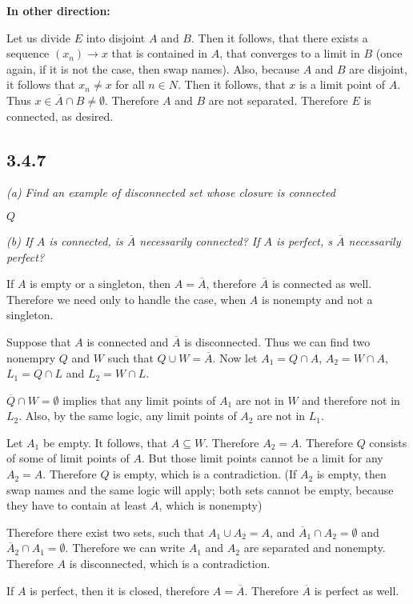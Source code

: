\documentclass[11pt,oneside,titlepage]{book}
\begin{document}
\textbf{In other direction:}

Let us divide $E$ into disjoint $A$ and $B$. Then it follows, that there
exists a sequence $(x_n) \to x$ that is contained in $A$, that converges to a
limit in $B$ (once again, if it is not the case, then swap names).
Also, because $A$ and $B$ are disjoint, it follows that $x_n \neq x$ for
all $n \in N$.
Then it follows, that $x$ is a limit point of $A$. Thus
$x \in \overline A \cap B \neq \emptyset$. Therefore $A$ and $B$ are not
separated. Therefore $E$ is connected, as desired.


\subsection*{3.4.7}
\textit{(a) Find an example of disconnected set whose closure is connected}

$Q$

\textit{(b) If $A$ is connected, is $\overline A$ necessarily connected? If
  $A$ is perfect, s $\overline A$ necessarily perfect?}

If $A$ is empty or a singleton, then $A = \overline A$, therefore $\overline
A$ is connected as well. Therefore we need only to handle the case, when
$A$ is nonempty and not a singleton.

Suppose that $A$ is connected and $\overline A$ is disconnected. Thus we can
find two nonempry $Q$ and $W$ such that $Q \cup W = \overline A$.
Now let $A_1 = Q \cap A$, $A_2 = W \cap A$, $L_1 = Q \cap L$ and
$L_2 = W \cap L$.

$\overline Q \cap W = \emptyset$ implies that any limit points of $A_1$ are
not in $W$ and therefore not in $L_2$.
Also, by the same logic, any limit points of $A_2$ are not in $L_1$.

Let $A_1$ be empty. It follows, that $A \subseteq W$. Therefore $A_2 = A$.
Therefore $Q$ consists
of some of  limit points of $A$. But those limit points cannot be a limit
for any $A_2 = A$. Therefore $Q$ is empty, which is a contradiction.
(If $A_2$ is empty, then swap names and the same logic will apply; both
sets cannot be empty, because they have to contain at least $A$, which is
nonempty)

Therefore there exist two sets, such that $A_1 \cup A_2 = A$, and
$\overline A_1 \cap A_2 = \emptyset$ and $\overline A_2 \cap A_1 = \emptyset$.
Therefore we can write $A_1$ and $A_2$ are separated and nonempty.
Therefore $A$ is disconnected, which is a contradiction.


If $A$ is perfect, then it is closed, therefore $A = \overline A$. Therefore
$\overline A$ is perfect as well.
\end{document}
